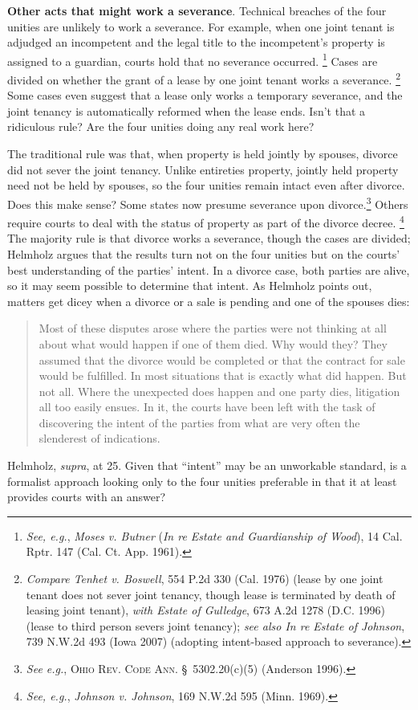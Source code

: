 \item \textbf{Other acts that might work a severance}. Technical breaches of the
four unities are unlikely to work a severance. For example, when one joint
tenant is adjudged an incompetent and the legal title to the incompetent's
property is assigned to a guardian, courts hold that no severance occurred.
\footnote{\textit{See, e.g.}, \emph{Moses v. Butner} (\emph{In re Estate and
Guardianship of Wood}), 14
Cal. Rptr. 147 (Cal. Ct. App. 1961).} Cases are divided on whether the grant of
a lease by one joint tenant works a severance. \footnote{\textit{Compare Tenhet
v. Boswell}, 554 P.2d 330 (Cal. 1976) (lease by one joint tenant does not sever
joint tenancy, though lease is terminated by death of leasing joint tenant),
\textit{with Estate of Gulledge}, 673 A.2d 1278 (D.C. 1996) (lease to third
person severs joint tenancy); \textit{see also In re Estate of Johnson}, 739
N.W.2d 493 (Iowa 2007) (adopting intent-based approach to severance).} Some
cases even suggest that a lease only works a temporary severance, and the joint
tenancy is automatically reformed when the lease ends. Isn't that a ridiculous
rule? Are the four unities doing any real work here?


The traditional rule was that, when property is held jointly by spouses, divorce
did not sever the joint tenancy. Unlike entireties property, jointly held
property need not be held by spouses, so the four unities remain intact even
after divorce. Does this make sense? Some states now presume severance upon
divorce.\footnote{\emph{See e.g.}, \textsc{Ohio Rev. Code Ann.} \S~5302.20(c)(5)
(Anderson 1996).} Others require courts to deal with the status of property as
part of the divorce decree. \footnote{\textit{See, e.g.}, \emph{Johnson v.
Johnson}, 169
N.W.2d 595 (Minn. 1969).} The majority rule is that divorce works a severance,
though the cases are divided; Helmholz argues that the results turn not on the
four unities but on the courts' best understanding of the parties' intent. In a
divorce case, both parties are alive, so it may seem possible to determine that
intent. As Helmholz points out, matters get dicey when a divorce or a sale is
pending and one of the spouses dies:
\begin{quote}
Most of these disputes arose where the parties were not thinking at all about
what would happen if one of them died. Why would they? They assumed that the
divorce would be completed or that the contract for sale would be fulfilled. In
most situations that is exactly what did happen. But not all. Where the
unexpected does happen and one party dies, litigation all too easily ensues. In
it, the courts have been left with the task of discovering the intent of the
parties from what are very often the slenderest of indications.
\end{quote}
Helmholz, \textit{supra}, at 25. Given that ``intent'' may be an unworkable
standard, is a formalist approach looking only to the four unities preferable
in that it at least provides courts with an answer?



